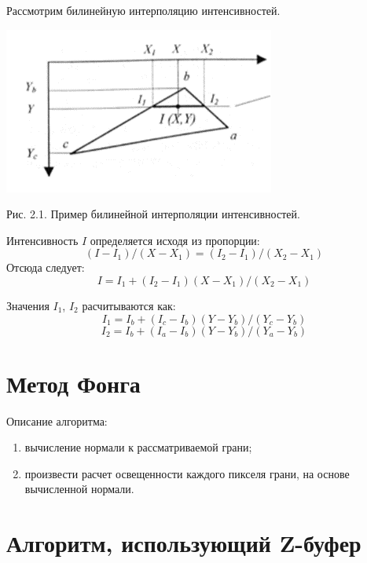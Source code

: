 \documentclass[12pt]{report}
\begin{document}
	Рассмотрим билинейную интерполяцию интенсивностей.
	
	\begin{center}
		\includegraphics[scale=1]{gourand.png}
		
		Рис. 2.1. Пример билинейной интерполяции интенсивностей.
	\end{center}

	Интенсивность $I$ определяется исходя из пропорции:
	\begin{equation}
		(I - I_{1})/(X - X_{1}) = (I_{2} - I_{1})/(X_{2} - X_{1})
	\end{equation}
	Отсюда следует:
	\begin{equation}
		I = I_{1} + (I_{2} - I_{1})(X - X_{1})/(X_{2} - X_{1})
	\end{equation}
	
	Значения $I_{1}$, $I_{2}$ расчитываются как:
	\begin{equation}
		I_{1} = I_{b} + (I_{c} - I_{b})(Y - Y_{b})/(Y_{c} - Y_{b})
	\end{equation}
	\begin{equation}
		I_{2} = I_{b} + (I_{a} - I_{b})(Y - Y_{b})/(Y_{a} - Y_{b})
	\end{equation}
	
	\section{Метод Фонга}
	
	Описание алгоритма:
	\begin{enumerate}
		\item вычисление нормали к рассматриваемой грани;
		\item произвести расчет освещенности каждого пикселя грани, на основе вычисленной нормали.
	\end{enumerate}

	\section{Алгоритм, использующий Z-буфер}
	
\end{document}
